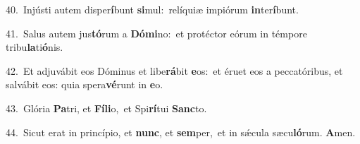 {\numbfont\textcolor{\numbcolor}{40.}}~Injústi autem disper\-\textbf{í}\-bunt \textbf{si}\-mul:~\star relíquiæ impiórum \textbf{in}\-ter\-\textbf{í}\-bunt.\par
{\numbfont\textcolor{\numbcolor}{41.}}~Salus autem jus\-\textbf{tó}\-rum a \textbf{Dó}\-\textbf{mi}no:~\star et protéctor eórum in témpore tribu\-\textbf{la}\-ti\-\textbf{ó}\-nis.\par
{\numbfont\textcolor{\numbcolor}{42.}}~Et adjuvábit eos Dóminus et libe\-\textbf{rá}\-bit \textbf{e}\-os:~\star et éruet eos a peccatóribus, et salvábit eos: quia spera\-\textbf{vé}\-runt in \textbf{e}\-o.\par
{\numbfont\textcolor{\numbcolor}{43.}}~Glória \textbf{Pa}\-tri, et \textbf{Fí}\-\textbf{li}o,~\star et Spi\-\textbf{rí}\-tui \textbf{Sanc}\-to.\par
{\numbfont\textcolor{\numbcolor}{44.}}~Sicut erat in princípio, et \textbf{nunc}\-, et \textbf{sem}\-per,~\star et in sǽcula sæcu\-\textbf{ló}\-rum. \textbf{A}\-men.\par
